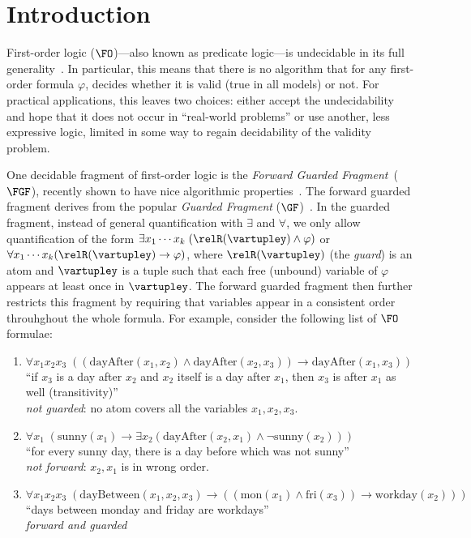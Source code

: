 \chapter{Introduction}\label{chap:introduction}

First-order logic ($\FO$)---also known as predicate logic---is undecidable in its full generality~\cite[Sec. 1.1]{borger1997}.
In particular, this means that there is no algorithm that for any first-order formula $\varphi$, decides whether it is valid (true in all models) or not.
For practical applications, this leaves two choices: either accept the undecidability and hope that it does not occur in ``real-world problems'' or use another, less expressive logic, limited in some way to regain decidability of the validity problem.

One decidable fragment of first-order logic is the \emph{Forward Guarded Fragment}~($\FGF$), recently shown to have nice algorithmic properties~\cite{Bednarczyk21}.
The forward guarded fragment derives from the popular \emph{Guarded Fragment} ($\GF$)~\cite{AndrekaNB98}.
In the guarded fragment, instead of general quantification with $\exists$ and $\forall$, we only allow quantification of the form $\exists{x_{1}\cdots{}x_{k}}\; (\relR(\vartupley) \land \varphi)$ or $\forall{x_{1}\cdots{}x_{k}} (\relR(\vartupley) \to \varphi)$, where $\relR(\vartupley)$ (the \emph{guard}) is an atom and $\vartupley$ is a tuple such that each free (unbound) variable of $\varphi$ appears at least once in $\vartupley$.
The forward guarded fragment then further restricts this fragment by requiring that variables appear in a consistent order throuhghout the whole formula.
For example, consider the following list of $\FO$ formulae:
\begin{enumerate}
  \item $\forall{x_{1}x_{2}x_{3}}\; ((\mathrm{dayAfter}(x_{1},x_{2}) \land \mathrm{dayAfter}(x_{2},x_{3})) \to \mathrm{dayAfter}(x_{1}, x_{3}))$ \\
        ``if $x_{3}$ is a day after $x_{2}$ and $x_{2}$ itself is a day after $x_{1}$, then $x_{3}$ is after $x_{1}$ as well (transitivity)'' \\
        \emph{not guarded}: no atom covers all the variables $x_{1}, x_{2}, x_{3}$.
  \item $\forall{x_{1}}\; (\mathrm{sunny}(x_{1}) \to \exists{x_{2}} (\mathrm{dayAfter}(x_{2},x_{1}) \land \neg \mathrm{sunny}(x_{2})))$ \\
        ``for every sunny day, there is a day before which was not sunny'' \\
        \emph{not forward}: $x_{2}, x_{1}$ is in wrong order.
  \item $\forall{x_{1}x_{2}x_{3}}\; (\mathrm{dayBetween}(x_{1},x_{2},x_{3}) \to ((\mathrm{mon}(x_{1}) \land \mathrm{fri}(x_{3})) \to \mathrm{workday}(x_{2})))$ \\
        ``days between monday and friday are workdays'' \\
        \emph{forward and guarded}
\end{enumerate}

